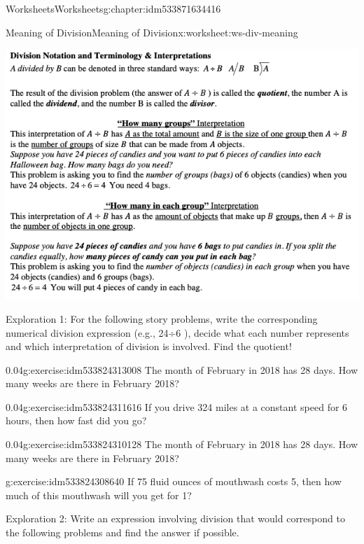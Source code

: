 \documentclass[twoside,11pt,]{book}
\begin{document}
\begin{chapterptx}{Worksheets}{}{Worksheets}{}{}{g:chapter:idm533871634416}
\begin{worksheet-section-numberless}{Meaning of Division}{}{Meaning of Division}{}{}{x:worksheet:ws-div-meaning}
\begin{introduction}{}
\begin{sidebyside}{1}{0}{0}{0}
\begin{sbspanel}{1}
\includegraphics[width=1\linewidth]{images/div-meaning.png}
\end{sbspanel}%
\end{sidebyside}%
%
\par
Exploration 1: For the following story problems, write the corresponding numerical division expression (e.g.,  24÷6 ), decide what each number represents and which interpretation of division is involved. Find the quotient!%
\end{introduction}%
\begin{divisionexercise}{1}{}{0.04}{g:exercise:idm533824313008}%
The month of February in 2018 has 28 days. How many weeks are there in February 2018?%
\end{divisionexercise}%
\begin{divisionexercise}{2}{}{0.04}{g:exercise:idm533824311616}%
If you drive 324 miles at a constant speed for 6 hours, then how fast did you go?%
\end{divisionexercise}%
\begin{divisionexercise}{3}{}{0.04}{g:exercise:idm533824310128}%
The month of February in 2018 has 28 days. How many weeks are there in February 2018?%
\end{divisionexercise}%
\begin{divisionexercise}{4}{}{}{g:exercise:idm533824308640}%
If 75 fluid ounces of mouthwash costs \textdollar{}5, then how much of this mouthwash will you get for \textdollar{}1?%
\end{divisionexercise}%
\clearpage
\begin{introduction}{}%
Exploration 2: Write an expression involving division that would correspond to the following problems and find the answer if possible.%

\end{introduction}
\end{worksheet-section-numberless}
\end{chapterptx}
\end{document}
